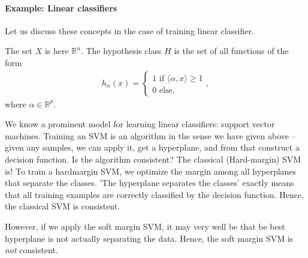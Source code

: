 \documentclass{article}
\newcommand{\sprod}[1]{\langle #1 \rangle}
\newcommand{\R}{\mathbb{R}}
\begin{document}
\paragraph{Example: Linear classifiers}    Let us discuss these concepts in the case of training linear classifier.

    The set $X$ is here $\R^n$. The hypothesis class $H$ is the set of all functions of the form
    \begin{align*}
        h_{\alpha}(x) = \begin{cases}
            1 \text{ if } \sprod{\alpha,x} \geq 1  \\
            0 \text{ else}.
        \end{cases},
    \end{align*}
    where $\alpha\in \R^p$.

    We know a prominent model for learning linear classifiers: support vector machines. Training an SVM is an algorithm in the sense we have given above -- given any samples, we can apply it, get a hyperplane, and from that construct a decision function. Is the algorithm consistent? The classical (Hard-margin) SVM is! To train a hardmargin SVM, we optimize the margin among all hyperplanes that separate the classes. 'The hyperplane separates the classes' exactly means that all training examples are correctly classified by the decision function. Hence, the classical SVM is consistent.

    However, if we apply the soft margin SVM, it may very well be that be best hyperplane is not actually separating the data. Hence, the soft margin SVM is \emph{not} consistent.

   
\
    
\end{document}
